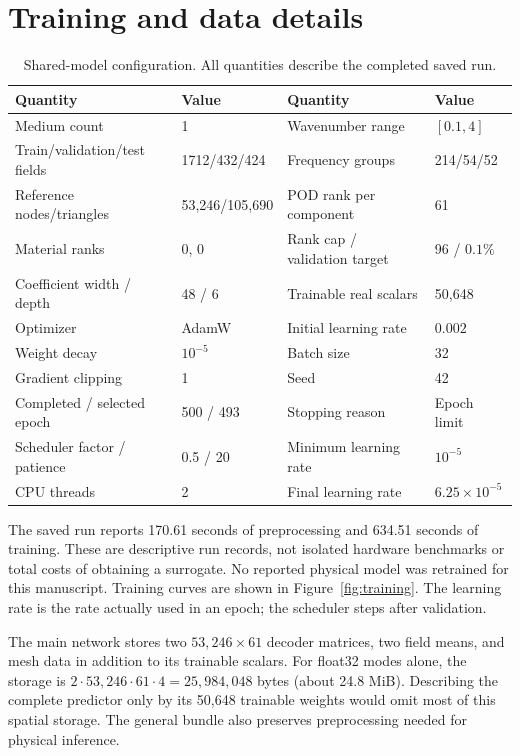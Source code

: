 \documentclass{article}
\begin{document}
\section{Training and data details}\label{app:protocol}
\begin{table}[h]
\centering
\caption{Shared-model configuration. All quantities describe the completed saved run.}
\begin{tabular}{ll@{\hspace{2em}}ll}
\toprule
Quantity & Value & Quantity & Value\\
\midrule
Medium count & 1 & Wavenumber range & $[0.1,4]$\\
Train/validation/test fields & 1712/432/424 & Frequency groups & 214/54/52\\
Reference nodes/triangles & 53,246/105,690 & POD rank per component & 61\\
Material ranks & 0, 0 & Rank cap / validation target & 96 / $0.1\%$\\
Coefficient width / depth & 48 / 6 & Trainable real scalars & 50,648\\
Optimizer & AdamW & Initial learning rate & $0.002$\\
Weight decay & $10^{-5}$ & Batch size & 32\\
Gradient clipping & 1 & Seed & 42\\
Completed / selected epoch & 500 / 493 & Stopping reason & Epoch limit\\
Scheduler factor / patience & 0.5 / 20 & Minimum learning rate & $10^{-5}$\\
CPU threads & 2 & Final learning rate & $6.25\times10^{-5}$\\
\bottomrule
\end{tabular}
\end{table}
The saved run reports 170.61 seconds of preprocessing and 634.51 seconds of training. These are descriptive run records, not isolated hardware benchmarks or total costs of obtaining a surrogate. No reported physical model was retrained for this manuscript. Training curves are shown in Figure~\ref{fig:training}. The learning rate is the rate actually used in an epoch; the scheduler steps after validation.

The main network stores two $53{,}246\times61$ decoder matrices, two field means, and mesh data in addition to its trainable scalars. For float32 modes alone, the storage is $2\cdot53{,}246\cdot61\cdot4=25{,}984{,}048$ bytes (about 24.8 MiB). Describing the complete predictor only by its 50,648 trainable weights would omit most of this spatial storage. The general bundle also preserves preprocessing needed for physical inference.
\end{document}
